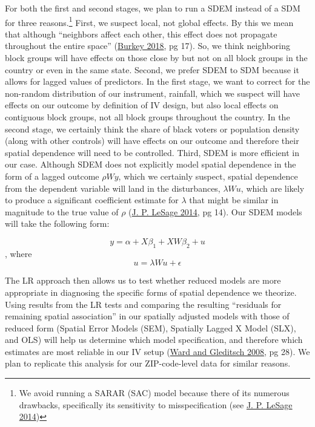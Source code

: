 \documentclass[
  12pt,
]{article}
\begin{document}
For both the first and second stages, we plan to run a SDEM instead of a SDM for three reasons.\footnote{We avoid running a SARAR (SAC) model because there of its numerous drawbacks, specifically its sensitivity to misspecification (see \protect\hyperlink{ref-LeSage2014}{J. P. LeSage 2014})} First, we suspect local, not global effects. By this we mean that although ``neighbors affect each other, this effect does not propagate throughout the entire space'' (\protect\hyperlink{ref-Burkey2018}{Burkey 2018}, pg 17). So, we think neighboring block groups will have effects on those close by but not on all block groups in the country or even in the same state. Second, we prefer SDEM to SDM because it allows for lagged values of predictors. In the first stage, we want to correct for the non-random distribution of our instrument, rainfall, which we suspect will have effects on our outcome by definition of IV design, but also local effects on contiguous block groups, not all block groups throughout the country. In the second stage, we certainly think the share of black voters or population density (along with other controls) will have effects on our outcome and therefore their spatial dependence will need to be controlled. Third, SDEM is more efficient in our case. Although SDEM does not explicitly model spatial dependence in the form of a lagged outcome \(\rho{Wy}\), which we certainly suspect, spatial dependence from the dependent variable will land in the disturbances, \(\lambda{Wu}\), which are likely to produce a significant coefficient estimate for \(\lambda\) that might be similar in magnitude to the true value of \(\rho\) (\protect\hyperlink{ref-LeSage2014}{J. P. LeSage 2014}, pg 14). Our SDEM models will take the following form:

\[y = \alpha{} + X\beta_1{} + XW\beta_2{} + u\], where \[ u = \lambda{Wu} + \epsilon{}\]

The LR approach then allows us to test whether reduced models are more appropriate in diagnosing the specific forms of spatial dependence we theorize. Using results from the LR tests and comparing the resulting ``residuals for remaining spatial association'' in our spatially adjusted models with those of reduced form (Spatial Error Models (SEM), Spatially Lagged X Model (SLX), and OLS) will help us determine which model specification, and therefore which estimates are most reliable in our IV setup (\protect\hyperlink{ref-Ward2008}{Ward and Gleditsch 2008}, pg 28). We plan to replicate this analysis for our ZIP-code-level data for similar reasons.
\end{document}
